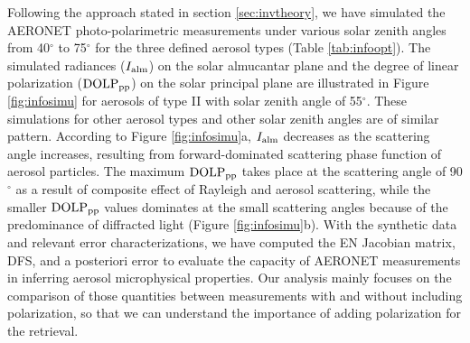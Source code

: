 Following the approach stated in section \ref{sec:invtheory}, 
we have simulated the AERONET photo-polarimetric measurements under various 
solar zenith angles from 40$^\circ$ to 75$^\circ$ for the three 
defined aerosol types (Table \ref{tab:infoopt}). The simulated radiances 
($I_\text{alm}$) on the solar almucantar plane and the degree of linear 
polarization ($\text{DOLP}_\text{pp}$) on the solar principal plane are illustrated in 
Figure \ref{fig:infosimu} for aerosols of type II with solar zenith angle of 
55$^\circ$. These simulations for other aerosol types and other
solar zenith angles are of similar pattern. According to Figure
\ref{fig:infosimu}a, $I_\text{alm}$ decreases as the scattering angle increases, 
resulting from forward-dominated scattering phase function of aerosol 
particles. The maximum $\text{DOLP}_\text{pp}$ takes place at the scattering angle of 
90$^\circ$ as a result of composite effect of Rayleigh and aerosol scattering, 
while the smaller $\text{DOLP}_\text{pp}$ values dominates at the small scattering angles 
because of the predominance of diffracted light (Figure \ref{fig:infosimu}b).
With the synthetic data and relevant error characterizations, we have computed
the EN Jacobian matrix, DFS, and a posteriori error to evaluate the capacity of
AERONET measurements in inferring aerosol microphysical properties. Our
analysis mainly focuses on the comparison of those quantities between
measurements with and without including polarization, so that we can understand
the importance of adding polarization for the retrieval.  

